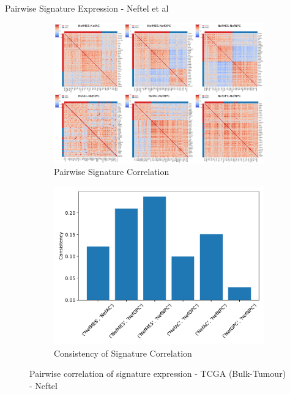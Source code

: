 \documentclass[aspectratio=169,9pt]{beamer}
\begin{document}
    \begin{frame}{Pairwise Signature Expression - Neftel et al}
        \begin{adjustwidth}{-5cm}{-5cm}
            \centering
            \begin{figure}
                \centering
                \begin{subfigure}[c]{0.7\textwidth}
                    \centering
                    \includegraphics[width=\textwidth]{TCGA_Corrplot_pair-Nef}
                    \caption{Pairwise Signature Correlation}
                \end{subfigure}
                \begin{subfigure}[c]{0.4\textwidth}
                    \centering
                    \includegraphics[width=\textwidth]{TCGA_Consistency_Nef}
                    \caption{Consistency of Signature Correlation}
                \end{subfigure}
                \caption{Pairwise correlation of signature expression - TCGA (Bulk-Tumour) - Neftel}
            \end{figure}
        \end{adjustwidth}
    \end{frame}
\end{document}
